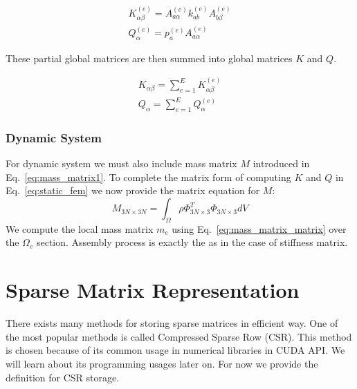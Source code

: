 \documentclass[en]{minipw} %
\begin{document}
\begin{equation}
\begin{aligned}
K^{(e)}_{\alpha \beta} =  A^{(e)}_{a \alpha} k^{(e)}_{a b} A^{(e)}_{b \beta}
\\
Q^{(e)}_{\alpha} =  p^{(e)}_{a} A^{(e)}_{a \alpha}
\end{aligned}
\end{equation}

These partial global matrices are then summed into global matrices $K$ and $Q$.

\begin{equation}
\begin{aligned}
K_{\alpha \beta} =  \sum^{E}_{e=1} K^{(e)}_{\alpha \beta}
\\
Q_{\alpha} =  \sum^{E}_{e=1} Q^{(e)}_{\alpha}
\end{aligned}
\end{equation}

\subsubsection{Dynamic System}
For dynamic system we must also include mass matrix $M$ introduced in Eq.~\ref{eq:mass_matrix1}. To complete the matrix form of computing $K$ and $Q$ in Eq.~\ref{eq:static_fem} we now provide the matrix equation for $M$:
\begin{equation}
\label{eq:mass_matrix_matrix}
M_{3N \times 3N} =  \int_{\Omega} \rho \Phi^{T}_{3N \times 3} \Phi_{3N \times 3} dV
\end{equation}
We compute the local mass matrix $m_{e}$ using Eq.~\ref{eq:mass_matrix_matrix} over the $\Omega_{e}$ section. Assembly process is exactly the as in the case of stiffness matrix.

\section{Sparse Matrix Representation}
There exists many methods for storing sparse matrices in efficient way. One of the most popular methods is called Compressed Sparse Row (CSR). This method is chosen because of its common usage in numerical libraries in CUDA API. We will learn about its programming usages later on. For now we provide the definition for CSR storage.
\end{document}
